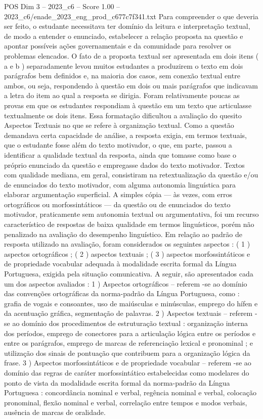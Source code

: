 \begin{textsample}{POS Dim 3 – 2023\_c6 – Score 1.00 – 2023\_c6/enade\_2023\_eng\_prod\_c677c7f341.txt}
Para compreender o que deveria ser feito, o estudante necessitava ter domínio da leitura e interpretação textual, de modo a entender o enunciado, estabelecer a relação proposta na questão e apontar possíveis ações governamentais e da comunidade para resolver os problemas elencados.
O fato de a proposta textual ser apresentada em dois itens ( a e b ) separadamente levou muitos estudantes a produzirem o texto em dois parágrafos bem definidos e, na maioria dos casos, sem conexão textual entre ambos, ou seja, respondendo à questão em dois ou mais parágrafos que indicavam a letra do item ao qual a resposta se dirigia.
Foram relativamente poucas as provas em que os estudantes respondiam à questão em um texto que articulasse textualmente os dois itens.
Essa formatação dificultou a avaliação do quesito Aspectos Textuais no que se refere à organização textual.
Como a questão demandava certa capacidade de análise, a resposta exigia, em termos textuais, que o estudante fosse além do texto motivador, o que, em parte, passou a identificar a qualidade textual da resposta, ainda que tomasse como base o próprio enunciado da questão e empregasse dados do texto motivador.
Textos com qualidade mediana, em geral, consistiram na retextualização da questão e/ou de enunciados do texto motivador, com alguma autonomia linguística para elaborar argumentação superficial.
A simples cópia — às vezes, com erros ortográficos ou morfossintáticos — da questão ou de enunciados do texto motivador, praticamente sem autonomia textual ou argumentativa, foi um recurso característico de respostas de baixa qualidade em termos linguísticos, porém não penalizado na avaliação do desempenho linguístico.
Em relação ao padrão de resposta utilizado na avaliação, foram considerados os seguintes aspectos : ( 1 ) aspectos ortográficos ; ( 2 ) aspectos textuais ; ( 3 ) aspectos morfossintáticos e de propriedade vocabular adequada à modalidade escrita formal da Língua Portuguesa, exigida pela situação comunicativa.
A seguir, são apresentados cada um dos aspectos avaliados : 1 ) Aspectos ortográficos – referem -se ao domínio das convenções ortográficas da norma-padrão da Língua Portuguesa, como : grafia de vogais e consoantes, uso de maiúsculas e minúsculas, emprego do hífen e da acentuação gráfica, segmentação de palavras. 2 ) Aspectos textuais – referem -se ao domínio dos procedimentos de estruturação textual : organização interna dos períodos, emprego de conectores para a articulação lógica entre os períodos e entre os parágrafos, emprego de marcas de referenciação lexical e pronominal ; e utilização dos sinais de pontuação que contribuem para a organização lógica da frase. 3 ) Aspectos morfossintáticos e de propriedade vocabular – referem -se ao domínio das regras de caráter morfossintático estabelecidas como modelares do ponto de vista da modalidade escrita formal da norma-padrão da Língua Portuguesa : concordância nominal e verbal, regência nominal e verbal, colocação pronominal, flexão nominal e verbal, correlação entre tempos e modos verbais, ausência de marcas de oralidade.

\end{textsample}
